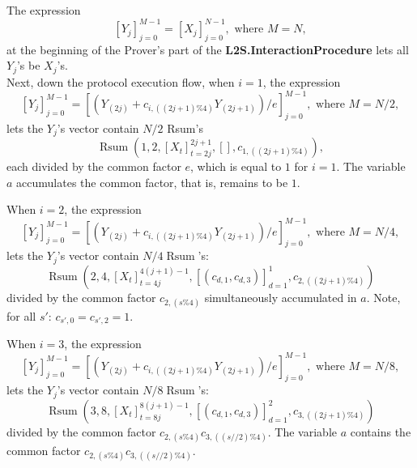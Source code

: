 \documentclass{mathcryptology} %
\DeclareMathOperator{\Rsum}{Rsum}
\theoremstyle{title}
\theoremstyle{titleof}
\begin{document}
    The expression
    \begin{equation*}
        {\left[Y_{j}\right]}_{j=0}^{M-1} =
            {\left[X_{j}\right]}_{j=0}^{N-1}, \text{ where $M=N$},
    \end{equation*}
    at the beginning of the Prover's part of the \textbf{L2S.InteractionProcedure} lets all $Y_{j}$'s be $X_{j}$'s.\\
    Next, down the protocol execution flow, when $i=1$, the expression
    \begin{equation*}
        {\left[Y_{j}\right]}_{j=0}^{M-1} =
            {\left[\left( Y_{\left(2j\right)} + c_{i,\left(\left(2j+1\right)\%4\right)} Y_{\left(2j+1\right)}\right) /
                e\right]}_{j=0}^{M-1}, \text{ where $M=N/2$},
    \end{equation*}
    lets the $Y_{j}$'s vector contain $N/2$ Rsum's
    \begin{equation*}
        \Rsum\left(1,2,{\left[X_{t}\right]}_{t=2j}^{2j+1}, [], c_{1,\left(\left(2j+1\right)\%4\right)}\right),
    \end{equation*}
    each divided by the common factor $e$, which is equal to $1$ for $i=1$. The variable $a$ accumulates the common factor, that is, remains to be $1$.

    When $i=2$, the expression
    \begin{equation*}
        {\left[Y_{j}\right]}_{j=0}^{M-1} =
            {\left[\left( Y_{\left(2j\right)} + c_{i,\left(\left(2j+1\right)\%4\right)} Y_{\left(2j+1\right)}\right) /
            e\right]}_{j=0}^{M-1}, \text{ where $M=N/4$},
    \end{equation*}
    lets the $Y_{j}$'s vector contain $N/4\Rsum$'s:
    \begin{equation*}
        \Rsum\left(2,4,{\left[X_{t}\right]}_{t=4j}^{4(j+1)-1},
            {\left[\left(c_{d,1},c_{d,3}\right)\right]}_{d=1}^1,
            c_{2,((2j+1)\%4)}\right)
    \end{equation*}
    divided by the common factor $c_{2,\left(s\%4\right)}$ simultaneously accumulated in $a$.
    Note, for all $s'$: $c_{s',0}=c_{s',2}=1$.

    When $i=3$, the expression
    \begin{equation*}
        {\left[Y_{j}\right]}_{j=0}^{M-1} =
            {\left[\left(Y_{\left(2j\right)} + c_{i,\left(\left(2j+1\right)\%4\right)} Y_{\left(2j+1\right)}\right) /
            e\right]}_{j=0}^{M-1}, \text{ where $M=N/8$},
    \end{equation*}
    lets the $Y_{j}$'s vector contain $N/8\Rsum$'s:
    \begin{equation*}
        \Rsum\left(3,8,{\left[X_{t}\right]}_{t=8j}^{8(j+1)-1},
            {\left[\left(c_{d,1},c_{d,3}\right)\right]}_{d=1}^{2},
            c_{3,\left(\left(2j+1\right)\%4\right)}\right)
    \end{equation*}
    divided by the common factor $c_{2,\left(s\%4\right)}c_{3,\left(\left(s//2\right)\%4\right)}$.
    The variable $a$ contains the common factor $c_{2,\left(s\%4\right)}c_{3,\left(\left(s//2\right)\%4\right)}$.
\end{document}
